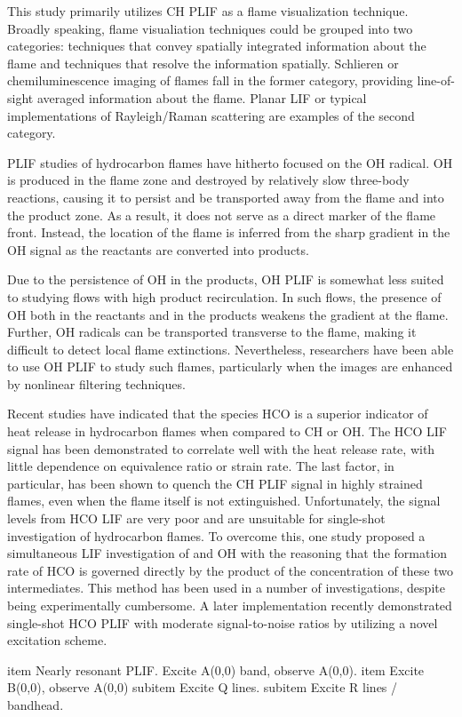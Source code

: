 This study primarily utilizes CH PLIF as a flame visualization technique.
Broadly speaking, flame visualiation techniques could be grouped into two categories: techniques that convey spatially integrated information about the flame and techniques that resolve the information spatially.
Schlieren or chemiluminescence imaging of flames fall in the former category, providing line-of-sight averaged information about the flame.
Planar LIF or typical implementations of Rayleigh/Raman scattering are examples of the second category.

PLIF studies of hydrocarbon flames have hitherto focused on the OH radical.
OH is produced in the flame zone and destroyed by relatively slow three-body reactions, causing it to persist and be transported away from the flame and into the product zone.\cite{1990-barlow}
As a result, it does not serve as a direct marker of the flame front.
Instead, the location of the flame is inferred from the sharp gradient in the OH signal as the reactants are converted into products.

Due to the persistence of OH in the products, OH PLIF is somewhat less suited to studying flows with high product recirculation.
In such flows, the presence of OH both in the reactants and in the products weakens the gradient at the flame.
Further, OH radicals can be transported transverse to the flame, making it difficult to detect local flame extinctions.
Nevertheless, researchers have been able to use OH PLIF to study such flames,\cite{1999-kaminski,2005-hult} particularly when the images are enhanced by nonlinear filtering techniques.\cite{2000-malm,2001-abu-gharbieh}

Recent studies\cite{1998-najm} have indicated that the species HCO is a superior indicator of heat release in hydrocarbon flames when compared to CH or OH.
The HCO LIF signal has been demonstrated to correlate well with the heat release rate, with little dependence on equivalence ratio or strain rate.
The last factor, in particular, has been shown to quench the CH PLIF signal\cite{2008-kiefer} in highly strained flames, even when the flame itself is not extinguished.
Unfortunately, the signal levels from HCO LIF are very poor\cite{1998-najm,1998-paul} and are unsuitable for single-shot investigation of hydrocarbon flames.
To overcome this, one study\cite{1998-paul} proposed a simultaneous LIF investigation of  and OH with the reasoning that the formation rate of HCO is governed directly by the product of the concentration of these two intermediates.
This method has been used in a number of investigations, despite being experimentally cumbersome.
A later implementation\cite{2009-kiefer} recently demonstrated single-shot HCO PLIF with moderate signal-to-noise ratios by utilizing a novel excitation scheme.


item Nearly resonant PLIF. Excite A(0,0) band, observe A(0,0).
item Excite B(0,0), observe A(0,0)
  subitem Excite Q lines.
  subitem Excite R lines / bandhead.


